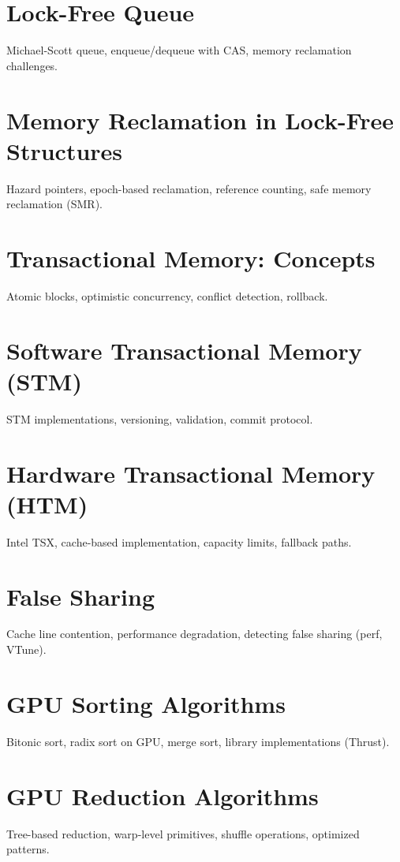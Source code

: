 \chapter{Lock-Free Queue}
Michael-Scott queue, enqueue/dequeue with CAS, memory reclamation challenges.

\chapter{Memory Reclamation in Lock-Free Structures}
Hazard pointers, epoch-based reclamation, reference counting, safe memory reclamation (SMR).

\chapter{Transactional Memory: Concepts}
Atomic blocks, optimistic concurrency, conflict detection, rollback.

\chapter{Software Transactional Memory (STM)}
STM implementations, versioning, validation, commit protocol.

\chapter{Hardware Transactional Memory (HTM)}
Intel TSX, cache-based implementation, capacity limits, fallback paths.

\chapter{False Sharing}
Cache line contention, performance degradation, detecting false sharing (perf, VTune).


\chapter{GPU Sorting Algorithms}
Bitonic sort, radix sort on GPU, merge sort, library implementations (Thrust).

\chapter{GPU Reduction Algorithms}
Tree-based reduction, warp-level primitives, shuffle operations, optimized patterns.


